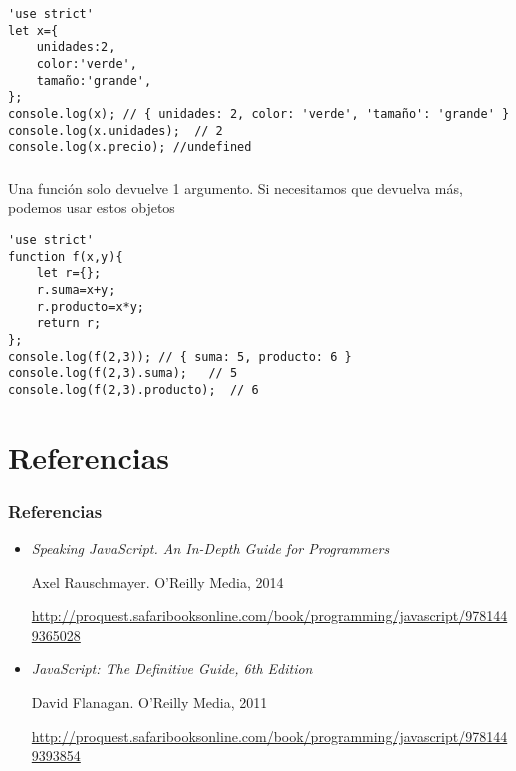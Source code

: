 \documentclass[ucs]{beamer}
\begin{document}
\begin{frame}[fragile]
\frametitle{}

  \begin{scriptsize}
  \begin{verbatim}
'use strict'
let x={
    unidades:2,
    color:'verde',
    tamaño:'grande',
};
console.log(x); // { unidades: 2, color: 'verde', 'tamaño': 'grande' }
console.log(x.unidades);  // 2
console.log(x.precio); //undefined
  \end{verbatim}
  \end{scriptsize}
\end{frame}




\begin{frame}[fragile]
\frametitle{}
Una función solo devuelve 1 argumento. Si necesitamos que devuelva
más, podemos usar estos objetos

  \begin{scriptsize}
  \begin{verbatim}
'use strict'
function f(x,y){
    let r={};
    r.suma=x+y;
    r.producto=x*y;
    return r;
};
console.log(f(2,3)); // { suma: 5, producto: 6 }
console.log(f(2,3).suma);   // 5
console.log(f(2,3).producto);  // 6
  \end{verbatim}
  \end{scriptsize}

\end{frame}


\section{Referencias}
\begin{frame}[fragile]
\frametitle{Referencias}
\begin{itemize}
\item
\emph{Speaking JavaScript. An In-Depth Guide for Programmers}

Axel Rauschmayer. O'Reilly Media, 2014


\begin{tiny}
\begin{flushright}
\url{http://proquest.safaribooksonline.com/book/programming/javascript/9781449365028}
\end{flushright}
\end{tiny}

\item
\emph{JavaScript: The Definitive Guide, 6th Edition}

David Flanagan. O'Reilly Media, 2011

\begin{tiny}
\begin{flushright}
\url{http://proquest.safaribooksonline.com/book/programming/javascript/9781449393854}
\end{flushright}
\end{tiny}


\end{itemize}

\end{frame}
\end{document}
